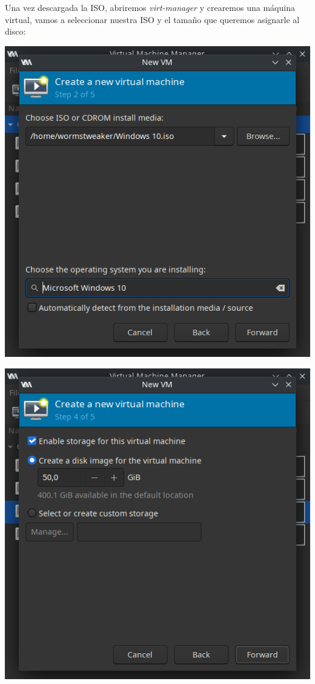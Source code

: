 \documentclass[12pt]{article}
\begin{document}
Una vez descargada la ISO, abriremos \emph{virt-manager} y crearemos una máquina virtual, vamos a seleccionar nuestra ISO y el tamaño que queremos asignarle al disco:

\begin{multicols}{2}
\begin{minipage}[t]{\linewidth}%
\vspace{0pt}
\includegraphics[width=\textwidth]{assets/vmm_iso_selection.png}
\end{minipage}
\begin{minipage}[t]{\linewidth}%
\vspace{0pt}
\includegraphics[width=\textwidth]{assets/vmm_disk_creation.png}
\end{minipage}
\end{multicols}
\end{document}
